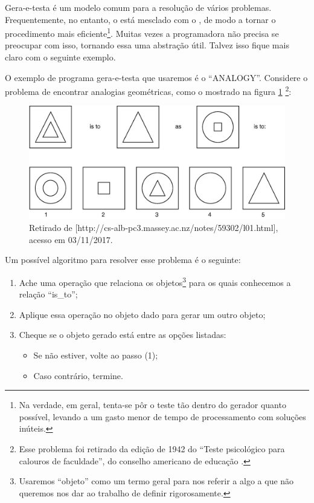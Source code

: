 \documentclass{article}
\begin{document}
Gera-e-testa é um modelo comum para a resolução de vários problemas. Frequentemente, no entanto, o  está mesclado com o , de modo a tornar o procedimento mais eficiente\footnote{Na verdade, em geral, tenta-se pôr o teste tão dentro do gerador quanto possível, levando a um gasto menor de tempo de processamento com soluções inúteis.}. Muitas vezes a programadora não precisa se preocupar com isso, tornando essa uma abstração útil. Talvez isso fique mais claro com o seguinte exemplo.

O exemplo de programa gera-e-testa que usaremos é o ``ANALOGY''. Considere o problema de encontrar analogias geométricas, como o mostrado na figura \ref{fig:psi} \footnote{Esse problema foi retirado da edição de 1942 do ``Teste psicológico para calouros de faculdade'', do conselho americano de educação \cite{evans}.}:

\begin{figure}[h]
  \caption{Retirado de [http://cs-alb-pc3.massey.ac.nz/notes/59302/l01.html], acesso em 03/11/2017.}\label{fig:psi}
  \centering
  \includegraphics[width=\linewidth]{analogy}
\end{figure}

Um possível algoritmo para resolver esse problema é o seguinte:

\begin{enumerate}
  \item Ache uma operação que relaciona os objetos\footnote{Usaremos ``objeto'' como um termo geral para nos referir a algo a que não queremos nos dar ao trabalho de definir rigorosamente.} para os quais conhecemos a relação ``is\_to'';
  \item Aplique essa operação no objeto dado para gerar um outro objeto;
  \item Cheque se o objeto gerado está entre as opções listadas:
    \begin{itemize}
      \item Se não estiver, volte ao passo (1);
      \item Caso contrário, termine.
    \end{itemize}
\end{enumerate}
\end{document}
